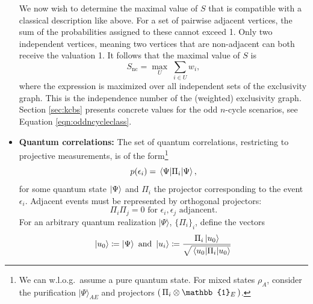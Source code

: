 \begin{itemize}
    We now wish to determine the maximal value of $S$ that is compatible with a classical description like above. For a set of pairwise adjacent vertices, the sum of the probabilities assigned to these cannot exceed 1. Only two independent vertices, meaning two vertices that are non-adjacent can both receive the valuation 1. It follows that the maximal value of $S$ is \begin{equation*}
    S_{\text{nc}}=\max\limits_{U}\;\sum_{i\in U} w_i,
    \end{equation*}
    where the expression is maximized over all independent sets of the exclusivity graph. This is the independence number of the (weighted) exclusivity graph. Section \ref{sec:kcbs} presents concrete values for the odd $n$-cycle scenarios, see Equation \ref{eqn:oddncycleclass}.
    
    \item \textbf{Quantum correlations:}
    The set of quantum correlations, restricting to projective measurements, is of the form\footnote{We can w.l.o.g.\ assume a pure quantum state. For mixed states $\rho_A$, consider the purification $\vert\Psi\rangle_{AE}$ and projectors $(\thinspace\Pi_i\otimes\mathbb{1}_E\thinspace)$.} \begin{equation*}
    p(\epsilon_i)=\expval{\Pi_i}{\Psi},
    \end{equation*}
    for some quantum state $\ket{\Psi}$ and $\Pi_{i}$ the projector corresponding to the event $\epsilon_i$. Adjacent events must be represented by orthogonal projectors:
    \begin{equation*}
        \Pi_{i}\Pi_{j} = 0 \text{ for } \epsilon_i, \epsilon_j \text{ adjancent}.
    \end{equation*}
    For an arbitrary quantum realization $\vert \Psi\rangle$, $\{\Pi_{i}\}_i$, define the vectors
    \[\ket{u_0} \coloneqq \ket{\Psi}\text{ and }\ket{u_i} \coloneqq \frac{\Pi_{i} \ket{u_0}}{\sqrt{\expval{\Pi_i}{u_0}}} \]
    

\end{itemize}
